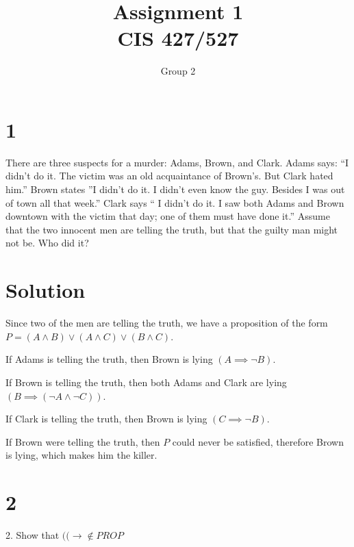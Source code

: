 \documentclass{article}
\begin{document}
\title{Assignment \raisebox{.22ex}{\large\#}1 \\
	CIS 427/527}
\author{Group 2}

\maketitle


\section*{1}
There are three suspects for a murder: Adams, Brown, and Clark. Adams says: “I didn’t do it. The victim was an old acquaintance of Brown’s. But Clark hated him.” Brown states ”I didn’t do it. I didn’t even know the guy. Besides I was out of town all that week.” Clark says “ I didn’t do it. I saw both Adams and Brown downtown with the victim that day; one of them must have done it.” Assume that the two innocent men are telling the truth, but that the guilty man might not be. Who did it?

\section*{Solution}
Since two of the men are telling the truth, we have a proposition of the form $P = (A \land B) \lor (A \land C) \lor (B \land C)$. 
\begin{itemize*}
\item If Adams is telling the truth, then Brown is lying $(A\implies \lnot B)$.
\item If Brown is telling the truth, then both Adams and Clark are lying $(B\implies (\lnot A \land \lnot C))$.
\item If Clark is telling the truth, then Brown is lying $(C\implies \lnot B)$.
\end{itemize*}

\noindent If Brown were telling the truth, then $P$ could never be satisfied, therefore Brown is lying, which makes him the killer.


\section*{2}
\begin{description*}
	\item[2.] Show that $(( \to \notin PROP$
\end{description*}
\end{document}
